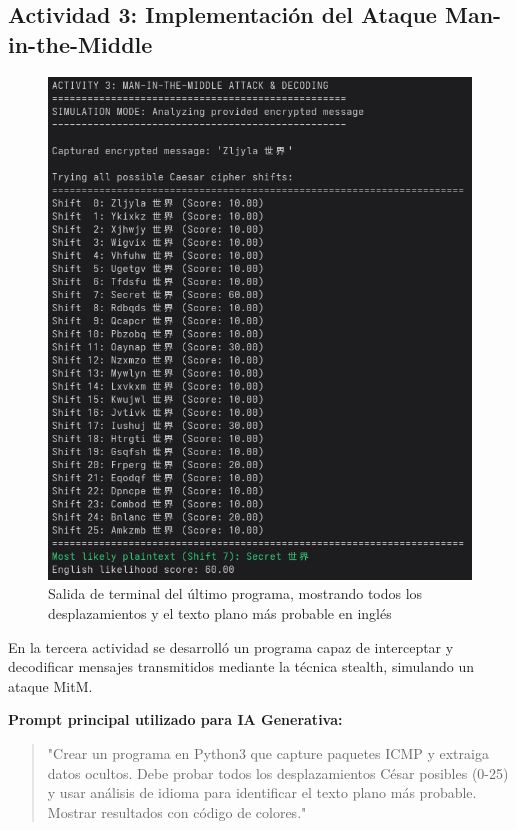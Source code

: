 \documentclass[letter,12pt]{article}
\begin{document}
\subsection{Actividad 3: Implementación del Ataque Man-in-the-Middle}
\begin{figure}
    \centering
    \includegraphics[width=1\linewidth]{actividades/Captura desde 2025-09-04 23-15-50.png}
    \caption{Salida de terminal del último programa, mostrando todos los desplazamientos y el texto plano más probable en inglés}
    \label{fig:terminal3}
\end{figure}
En la tercera actividad se desarrolló un programa capaz de interceptar y decodificar mensajes transmitidos mediante la técnica stealth, simulando un ataque MitM.

\textbf{Prompt principal utilizado para IA Generativa:}
\begin{quote}
"Crear un programa en Python3 que capture paquetes ICMP y extraiga datos ocultos. Debe probar todos los desplazamientos César posibles (0-25) y usar análisis de idioma para identificar el texto plano más probable. Mostrar resultados con código de colores."
\end{quote}
\end{document}
